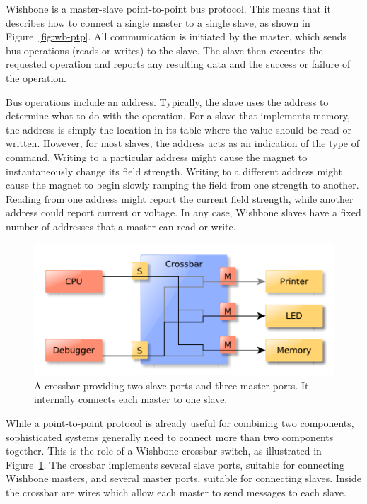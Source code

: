 \documentclass[a4paper]{jacow}
\begin{document}
Wishbone is a master-slave point-to-point bus protocol.
This means that it describes how to connect a single master to a single slave,
as shown in Figure~\ref{fig:wb-ptp}.
All communication is initiated by the master,
which sends bus operations (reads or writes) to the slave.
The slave then executes the requested operation and reports any resulting
data and the success or failure of the operation.

Bus operations include an address.
Typically, the slave uses the address to determine what to do with the operation.
For a slave that implements memory, the address is simply the location in
its table where the value should be read or written.
However, for most slaves, the address acts as an indication of the type of command.
Writing to a particular address might cause the magnet to instantaneously
change its field strength.
Writing to a different address might cause the magnet to begin slowly ramping 
the field from one strength to another.
Reading from one address might report the current field strength,
while another address could report current or voltage.
In any case,
Wishbone slaves have a fixed number of addresses that a master can read or write.

\begin{figure}[t]
  \centering
  \includegraphics*[width=\columnwidth]{THHA2O03f2}
  \caption{A crossbar providing two slave ports and three
  master ports. It internally connects each master to one slave.}
  \label{fig:crossbar}
\end{figure}

While a point-to-point protocol is already useful for combining two components,
sophisticated systems generally need to connect more than two components together.
This is the role of a Wishbone crossbar switch, as illustrated in Figure~\ref{fig:crossbar}.
The crossbar implements several slave ports, suitable for connecting
Wishbone masters, and several master ports, suitable for connecting slaves.
Inside the crossbar are wires which allow each master to send messages to each slave.
\end{document}
